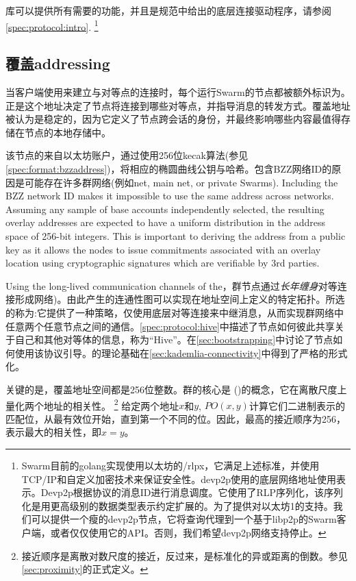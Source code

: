库可以提供所有需要的功能，并且是规范中给出的底层连接驱动程序，请参阅\ref{spec:protocol:intro}.%
%
\footnote{Swarm目前的golang实现使用以太坊的/rlpx，它满足上述标准，并使用TCP/IP和自定义加密技术来保证安全性。devp2p使用的底层网络地址使用表示。Devp2p根据协议的消息ID进行消息调度。它使用了RLP序列化，该序列化是用更高级别的数据类型表示约定扩展的。为了提供对以太坊1的支持。我们可以提供一个瘦的devp2p节点，它将查询代理到一个基于libp2p的Swarm客户端，或者仅仅使用它的API。否则，我们希望devp2p网络支持停止。}

\subsection{覆盖addressing\statusgreen}\label{sec:overlay-addressing} 
\green{}

当客户端使用来建立与对等点的连接时，每个运行Swarm的节点都被额外标识为。正是这个地址决定了节点将连接到哪些对等点，并指导消息的转发方式。覆盖地址被认为是稳定的，因为它定义了节点跨会话的身份，并最终影响哪些内容最值得存储在节点的本地存储中。

该节点的来自以太坊账户，通过使用256位kecak算法(参见\ref{spec:format:bzzaddress})，将相应的椭圆曲线公钥与哈希。包含BZZ网络ID的原因是可能存在许多群网络(例如\test net, main net, or private Swarms). Including the BZZ network ID makes it impossible to use the same address across networks. Assuming any sample of base accounts independently selected, the resulting overlay addresses are expected to have a uniform distribution in the address space of 256-bit integers. This is important to deriving the address from a public key as it allows the nodes to issue commitments associated with an overlay location using cryptographic signatures which are verifiable by 3rd parties. 

Using the long-lived communication channels of the，群节点通过\emph{长年缠身}对等连接形成网络)。由此产生的连通性图可以实现在地址空间上定义的特定拓扑。所选的称为:它提供了一种策略，仅使用底层对等连接来中继消息，从而实现群网络中任意两个任意节点之间的通信。\ref{spec:protocol:hive}中描述了节点如何彼此共享关于自己和其他对等体的信息，称为“Hive”。在\ref{sec:bootstrapping}中讨论了节点如何使用该协议引导。的理论基础在\ref{sec:kademlia-connectivity}中得到了严格的形式化。 

关键的是，覆盖地址空间都是256位整数。群的核心是 ()的概念，它在离散尺度上量化两个地址的相关性。%
%
\footnote{接近顺序是离散对数尺度的接近，反过来，是标准化的异或距离的倒数。参见\ref{sec:proximity}的正式定义。}
%
给定两个地址$x$和$y$, $\mathit{PO}(x,y)$计算它们二进制表示的匹配位，从最有效位开始，直到第一个不同的位。因此，最高的接近顺序为256，表示最大的相关性，即$x=y$。


